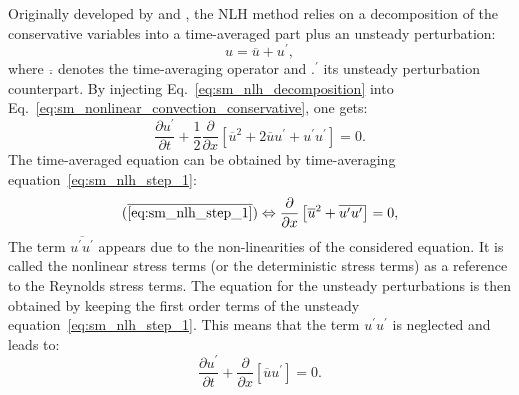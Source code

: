 
Originally developed by \citet{He1998} and \citet{Ning1998},
the NLH method
relies on a decomposition of the conservative variables into a
time-averaged part plus an unsteady perturbation:
\begin{equation}
	u = \overline{u} + u^\prime,
	\label{eq:sm_nlh_decomposition}
\end{equation}
where $\overline{.}$ denotes the time-averaging operator and
$.^\prime$ its unsteady perturbation counterpart.
By injecting Eq.~\ref{eq:sm_nlh_decomposition} into
Eq.~\ref{eq:sm_nonlinear_convection_conservative}, one gets:
\begin{equation}
	\frac{\partial u^\prime}{\partial t} + 
	\frac{1}{2}\frac{\partial}{\partial x} \left[
	\overline{u}^2 + 2 \overline{u} u^\prime + u^\prime u^\prime \right] = 
	0.
	\label{eq:sm_nlh_step_1}
\end{equation}
The time-averaged equation can be obtained by time-averaging
equation~\ref{eq:sm_nlh_step_1}:
\begin{equation}
	(\overline{\ref{eq:sm_nlh_step_1}})
	\Leftrightarrow
	\frac{\partial}{\partial x}
	\left[\overline{u}^2 + 
	\overline{u^\prime u^\prime}\right] =
	0,
	\label{eq:sm_nlh_step_2}
\end{equation}
The term $\overline{u^\prime u^\prime}$
appears due to the non-linearities of the considered equation. It
is called the nonlinear stress terms 
(or the deterministic stress terms) as a reference to 
the Reynolds stress terms. 
The equation for the unsteady perturbations is then obtained by keeping
the first order terms of the unsteady equation~\ref{eq:sm_nlh_step_1}.
This means that the term $u^\prime u^\prime$ is neglected and leads
to:
\begin{equation}
	\frac{\partial u^\prime}{\partial t} + 
	\frac{\partial}{\partial x} \left[\overline{u} u^\prime \right] = 
	0.
\end{equation}

